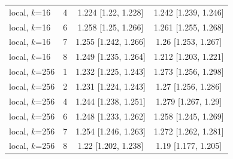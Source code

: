 {\begin{longtable}{llcc}
local, $k$=16 & 4 & 1.224 [1.22, 1.228] & 1.242 [1.239, 1.246] \\
local, $k$=16 & 6 & 1.258 [1.25, 1.266] & 1.261 [1.255, 1.268] \\
local, $k$=16 & 7 & 1.255 [1.242, 1.266] & 1.26 [1.253, 1.267] \\
local, $k$=16 & 8 & 1.249 [1.235, 1.264] & 1.212 [1.203, 1.221] \\
\midrule
local, $k$=256 & 1 & 1.232 [1.225, 1.243] & 1.273 [1.256, 1.298] \\
local, $k$=256 & 2 & 1.231 [1.224, 1.243] & 1.27 [1.256, 1.286] \\
local, $k$=256 & 4 & 1.244 [1.238, 1.251] & 1.279 [1.267, 1.29] \\
local, $k$=256 & 6 & 1.248 [1.233, 1.262] & 1.258 [1.245, 1.269] \\
local, $k$=256 & 7 & 1.254 [1.246, 1.263] & 1.272 [1.262, 1.281] \\
local, $k$=256 & 8 & 1.22 [1.202, 1.238] & 1.19 [1.177, 1.205] \\
\end{longtable}
}

